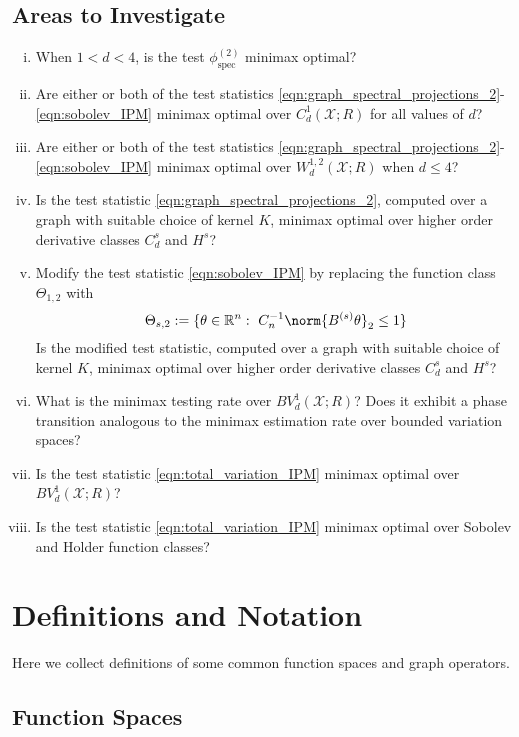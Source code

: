 \documentclass{article}
\newcommand{\Reals}{\mathbb{R}}
\newcommand{\1}{\mathbf{1}}
\newcommand{\spec}{\mathrm{spec}}
\theoremstyle{alden}
\theoremstyle{aldenthm}
\theoremstyle{definition}
\theoremstyle{remark}
\begin{document}
\subsection{Areas to Investigate}

\begin{enumerate}[(i)]
	\item When $1 < d < 4$, is the test $\phi_{\spec}^{(2)}$ minimax optimal?
	\item Are either or both of the test statistics \eqref{eqn:graph_spectral_projections_2}-\eqref{eqn:sobolev_IPM} minimax optimal over $C_d^1(\mathcal{X};R)$ for all values of $d$?
	\item Are either or both of the test statistics \eqref{eqn:graph_spectral_projections_2}-\eqref{eqn:sobolev_IPM} minimax optimal over $W_d^{1,2}(\mathcal{X};R)$ when $d \leq 4$?
	\item Is the test statistic \eqref{eqn:graph_spectral_projections_2}, computed over a graph with suitable choice of kernel $K$, minimax optimal over higher order derivative classes $C_d^s$ and $H^s$? 
	\item Modify the test statistic \eqref{eqn:sobolev_IPM} by replacing the function class $\Theta_{1,2}$ with
	\begin{equation}
	\Theta_{s,2} := \{\theta \in \Reals^n:~ C_n^{-1} \norm{B^{(s)}\theta}_2 \leq 1\} 
	\end{equation}
	Is the modified test statistic, computed over a graph with suitable choice of kernel $K$, minimax optimal over higher order derivative classes $C_d^s$ and $H^s$?
	\item What is the minimax testing rate over $BV_d^{1}(\mathcal{X};R)$? Does it exhibit a phase transition analogous to the minimax estimation rate over bounded variation spaces?
	\item Is the test statistic \eqref{eqn:total_variation_IPM} minimax optimal over $BV_d^{1}(\mathcal{X};R)$?
	\item Is the test statistic \eqref{eqn:total_variation_IPM} minimax optimal over Sobolev and Holder function classes?
\end{enumerate}

\section{Definitions and Notation}

Here we collect definitions of some common function spaces and graph operators.

\subsection{Function Spaces}
\end{document}
